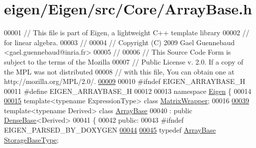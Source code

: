 \hypertarget{eigen_2_eigen_2src_2_core_2_array_base_8h_source}{}\section{eigen/\+Eigen/src/\+Core/\+Array\+Base.h}
\label{eigen_2_eigen_2src_2_core_2_array_base_8h_source}

\begin{DoxyCode}
00001 \textcolor{comment}{// This file is part of Eigen, a lightweight C++ template library}
00002 \textcolor{comment}{// for linear algebra.}
00003 \textcolor{comment}{//}
00004 \textcolor{comment}{// Copyright (C) 2009 Gael Guennebaud <gael.guennebaud@inria.fr>}
00005 \textcolor{comment}{//}
00006 \textcolor{comment}{// This Source Code Form is subject to the terms of the Mozilla}
00007 \textcolor{comment}{// Public License v. 2.0. If a copy of the MPL was not distributed}
00008 \textcolor{comment}{// with this file, You can obtain one at http://mozilla.org/MPL/2.0/.}
\hyperlink{group___core___module_a73817b0bf0b959cab85c453302100101}{00009} 
00010 \textcolor{preprocessor}{#ifndef EIGEN\_ARRAYBASE\_H}
00011 \textcolor{preprocessor}{#define EIGEN\_ARRAYBASE\_H}
00012 
00013 \textcolor{keyword}{namespace }\hyperlink{namespace_eigen}{Eigen} \{ 
00014 
\hyperlink{group___core___module}{00015} \textcolor{keyword}{template}<\textcolor{keyword}{typename} ExpressionType> \textcolor{keyword}{class }\hyperlink{group___core___module_class_eigen_1_1_matrix_wrapper}{MatrixWrapper};
00016 
\hyperlink{group___core___module}{00039} \textcolor{keyword}{template}<\textcolor{keyword}{typename} Derived> \textcolor{keyword}{class }\hyperlink{group___core___module_class_eigen_1_1_array_base}{ArrayBase}
00040   : \textcolor{keyword}{public} \hyperlink{group___core___module_class_eigen_1_1_dense_base}{DenseBase}<Derived>
00041 \{
00042   \textcolor{keyword}{public}:
00043 \textcolor{preprocessor}{#ifndef EIGEN\_PARSED\_BY\_DOXYGEN}
\hyperlink{group___core___module_a5bce24aa0762399c48cde7777c21c9e2}{00044} 
\hyperlink{group___core___module_a7c296f02281624d9c76eb864ab7209ce}{00045}     \textcolor{keyword}{typedef} \hyperlink{group___core___module_class_eigen_1_1_array_base}{ArrayBase} \hyperlink{group___core___module_a7c296f02281624d9c76eb864ab7209ce}{StorageBaseType};

\end{DoxyCode}
